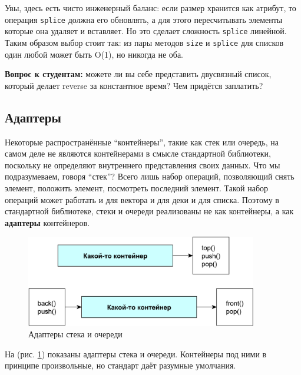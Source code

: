 \documentclass[a4paper,12pt,oneside]{book}
\newif\ifanswers
\begin{document}
Увы, здесь есть чисто инженерный баланс: если размер хранится как атрибут, то операция \lstinline!splice! должна его обновлять, а для этого пересчитывать элементы которые она удаляет и вставляет. Но это сделает сложность \lstinline!splice! линейной. Таким образом выбор стоит так: из пары методов \lstinline!size! и \lstinline!splice! для списков один любой может быть O(1), но никогда не оба.

\textbf{Вопрос к студентам:} можете ли вы себе представить двусвязный список, который делает reverse за константное время? Чем придётся заплатить?

\ifanswers
Например хранить в списке поле direction и сверяться с ним при переходе к next для выбора конкретной связи для перехода. Цена в общем-то невелика, но обычно её не платят, уж больно reverse специфичная и редко нужная штука.
\fi

\subsection{Адаптеры}

Некоторые распространённые ``контейнеры'', такие как стек или очередь, на самом деле не являются контейнерами в смысле стандартной библиотеки, поскольку не определяют внутреннего представления своих данных. Что мы подразумеваем, говоря ``стек''? Всего лишь набор операций, позволяющий снять элемент, положить элемент, посмотреть последний элемент. Такой набор операций может работать и для вектора и для деки и для списка. Поэтому в стандартной библиотеке, стеки и очереди реализованы не как контейнеры, а как \textbf{адаптеры} контейнеров.

\begin{figure}[ht]
\centering
\includegraphics[width=0.9\textwidth]{illustrations/adapters-crop.pdf}
\caption{Адаптеры стека и очереди}
\label{fig:adapters_sq}
\end{figure}

На (рис. \ref{fig:adapters_sq}) показаны адаптеры стека и очереди. Контейнеры под ними в принципе произвольные, но стандарт даёт разумные умолчания.
\end{document}
